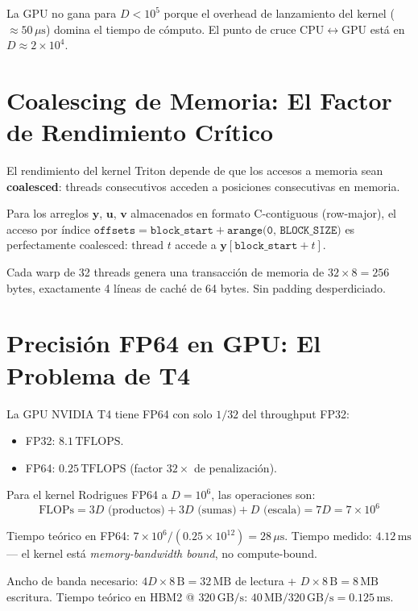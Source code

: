 La GPU no gana para $D < 10^5$ porque el overhead de lanzamiento del kernel
($\approx 50\,\mu\text{s}$) domina el tiempo de cómputo. El punto de cruce
CPU$\leftrightarrow$GPU está en $D \approx 2 \times 10^4$.

\section{Coalescing de Memoria: El Factor de Rendimiento Crítico}

El rendimiento del kernel Triton depende de que los accesos a memoria sean
\textbf{coalesced}: threads consecutivos acceden a posiciones consecutivas en memoria.

Para los arreglos $\mathbf{y}$, $\mathbf{u}$, $\mathbf{v}$ almacenados en formato
C-contiguous (row-major), el acceso por índice $\texttt{offsets} = \texttt{block\_start} + \texttt{arange(0, BLOCK\_SIZE)}$
es perfectamente coalesced: $\text{thread } t$ accede a $\mathbf{y}[\texttt{block\_start} + t]$.

Cada warp de 32 threads genera una transacción de memoria de $32 \times 8 = 256$ bytes,
exactamente 4 líneas de caché de 64 bytes. Sin padding desperdiciado.

\section{Precisión FP64 en GPU: El Problema de T4}

La GPU NVIDIA T4 tiene FP64 con solo $1/32$ del throughput FP32:
\begin{itemize}
\item FP32: $8.1\,\text{TFLOPS}$.
\item FP64: $0.25\,\text{TFLOPS}$ (factor $32\times$ de penalización).
\end{itemize}

Para el kernel Rodrigues FP64 a $D = 10^6$, las operaciones son:
\begin{equation}
\text{FLOPs} = 3D \text{ (productos)} + 3D \text{ (sumas)} + D \text{ (escala)} = 7D = 7 \times 10^6
\end{equation}

Tiempo teórico en FP64: $7 \times 10^6 / (0.25 \times 10^{12}) = 28\,\mu\text{s}$.
Tiempo medido: $4.12\,\text{ms}$ --- el kernel está \textit{memory-bandwidth bound}, no compute-bound.

Ancho de banda necesario: $4D \times 8\,\text{B} = 32\,\text{MB}$ de lectura + $D \times 8\,\text{B} = 8\,\text{MB}$ escritura.
Tiempo teórico en HBM2 @ $320\,\text{GB/s}$: $40\,\text{MB}/320\,\text{GB/s} = 0.125\,\text{ms}$.

